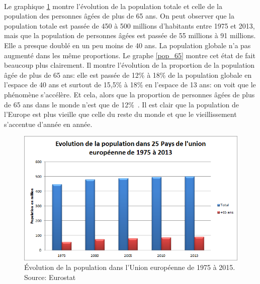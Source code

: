 \paragraph{}Le graphique \ref{eu_demo} montre l’évolution de la population totale et celle de la population des personnes âgées de plus de 65 ans. On peut observer que la population totale est passée de 450 à 500 millions d’habitants entre 1975 et 2013, mais que la population de personnes âgées est passée de 55 millions à 91 millions. Elle a presque doublé en un peu moins de 40 ans. La population globale n’a pas augmenté dans les même proportions. Le graphe \ref{pop_65} montre cet état de fait beaucoup plus clairement. Il montre l’évolution de la proportion de la population âgée de plus de 65 ans: elle est passée de 12\% à 18\% de la population globale en l’espace de 40 ans et surtout de 15,5\% à 18\% en l’espace de 13 ans: on voit que le phénomène s'accélère.  Et cela, alors que la proportion de personnes âgées de plus de 65 ans dans le monde n’est que de 12\%~\citep{ined}. Il est clair que la population de l’Europe est plus vieille que celle du reste du monde et que le vieillissement s’accentue d’année en année. 


\begin{figure}[h!]
    \begin{center}
        \includegraphics[scale=0.7]{document/pop_eu.png}
        \caption{Évolution de la population dans l'Union européenne de 1975 à 2015. Source: Eurostat~\citep{eurostat_pop}}
        \label{eu_demo}
    \end{center}
\end{figure}



